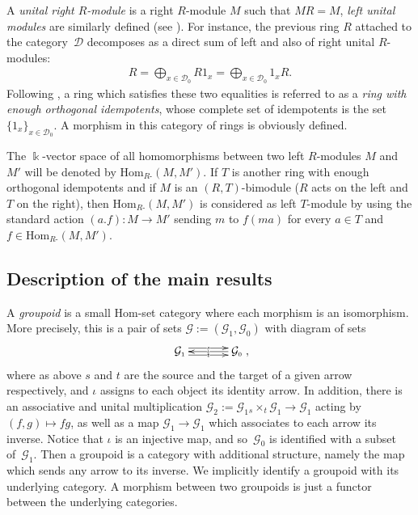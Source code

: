 \documentclass[pdftex]{sigma}
\numberwithin{equation}{section}
\renewcommand{\hom}[3]{\mathrm{Hom}_{\Sscript{#1}}\left(#2, #3\right)}
\newcommand{\Go}{\cG_{\Sscript{0}}}
\newcommand{\Ga}{\cG_{\Sscript{1}}}
\newcommand{\Do}{\cD_{\Sscript{0}}}
\newcommand{\cD}{{\mathcal D}}
\newcommand{\cG}{{\mathcal G}}
\newcommand{\Sscript}[1]{\scriptscriptstyle{#1}}
\newcommand{\due}[3]{{}_{{#2 }} {#1}_{{ #3}} }
\begin{document}
A \emph{unital right $R$-module} is a right $R$-module $M$ such that $MR=M$, \emph{left unital modules} are similarly defined (see \cite[p.~347]{Gabriel:1962}). For instance, the previous ring $R$ attached to the category~$\cD$ decomposes as a direct sum of left and also of right unital $R$-modules:
\begin{gather*}
R = \bigoplus_{x \in \Do} R 1_{\Sscript{x}} = \bigoplus_{x \in \Do} 1_{\Sscript{x}} R.
\end{gather*}
Following \cite{Fuller:1976}, a ring which satisfies these two equalities is referred to as a \emph{ring with enough orthogonal idempotents}, whose complete set of idempotents is the set $\{1_{\Sscript{x}}\}_{x \in \Do}$. A morphism in this category of rings is obviously defined.

The $\Bbbk$-vector space of all homomorphisms between two left $R$-modules $M$ and $M'$ will be denoted by $\hom{R\text{-}}{M}{M'}$. If $T$ is another ring with enough orthogonal idempotents and if $M$ is an $(R, T)$-bimodule ($R$ acts on the left and $T$ on the right), then $\hom{R\text{-}}{M}{M'}$ is considered as left $T$-module by using the standard action $(a .f) \colon M \to M'$ sending $m$ to $f(m a)$ for every $a \in T$ and $f \in \hom{R\text{-}}{M}{M'}$.

\subsection{Description of the main results}\label{ssec:raroes}
A \emph{groupoid} is a small Hom-set category where each morphism is an isomorphism. More precisely, this is a pair of sets
$\cG:=(\cG_{\Sscript{1}}, \cG_{\Sscript{0}})$ with diagram of sets
\begin{gather*}
\xymatrix@C=35pt{
\cG_{\Sscript{1}}\ar@<0.70ex>@{->}|-{\scriptscriptstyle{{s}}}[r]
\ar@<-0.70ex>@{->}|-{\scriptscriptstyle{{t}}}[r] & \ar@{->}|-{
\scriptscriptstyle{\iota}}[l] \cG_{\Sscript{0}}},
\end{gather*}
where as above $s$ and $t$ are the source and the target of a given arrow respectively, and $\iota$ assigns to each object its identity arrow. In addition, there is an associative and unital multiplication $\cG_{\Sscript{2}}:= \cG_{\Sscript{1}} \due \times {\Sscript{{s}}} { \Sscript{{t}}} \cG_{\Sscript{1}} \to \cG_{\Sscript{1}}$ acting by $(f,g) \mapsto fg$, as well as a map $\cG_{\Sscript{1}} \to \cG_{\Sscript{1}}$ which associates to each arrow its inverse. Notice that $\iota$ is an injective map, and so~$\Go$ is identified with a subset of~$\Ga$. Then a groupoid is a category with additional structure, namely the map which sends any arrow to its inverse. We implicitly identify a groupoid with its underlying category. A morphism between two groupoids is just a functor between the underlying categories.
\end{document}
